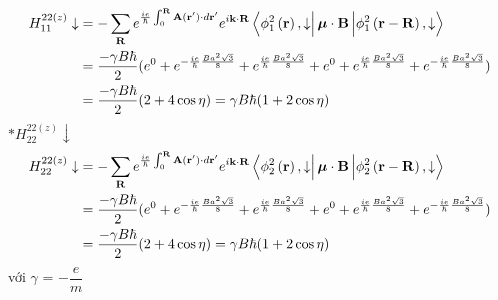 \documentclass{report}
\newcommand{\f}[2]{\dfrac{#1}{#2}}
\begin{document}
\begin{align*}
	H_{11}^{22(z)} \downarrow & = - \sum_{\mathbf{R}} e^{\frac{ie}{\hbar}\int_0^{\mathbf{R}}\mathbf{A}(\mathbf{r'})\cdot d\mathbf{r'}}e^{i\mathbf{k\cdot R}} \bra{\phi^{2}_{1} \left(\mathbf{r}\right), \downarrow} \boldsymbol{\mu}\cdot \mathbf{B} \ket{\phi^{2}_{1} \left(\mathbf{r - R}\right) ,\downarrow} \\
	                          & = \f{ -\gamma B\hbar}{2} (e^{0} + e^{-\frac{ie}{\hbar}\frac{Ba^2\sqrt{3}}{8}} + e^{\frac{ie}{\hbar}\frac{Ba^2\sqrt{3}}{8}} + e^{0} +
	e^{\frac{ie}{\hbar}\frac{Ba^2\sqrt{3}}{8}}
	+ e^{-\frac{ie}{\hbar}\frac{Ba^2\sqrt{3}}{8}} )                                                                                                                                                                                                                                                             \\
	                          & = \f{-\gamma B\hbar}{2} (2 + 4\cos\eta)  = \gamma B\hbar(1+2\cos\eta)
\end{align*}
$\ast 	H_{22}^{22(z)} \downarrow$
\begin{align*}
	H_{22}^{22(z)} \downarrow & = - \sum_{\mathbf{R}} e^{\frac{ie}{\hbar}\int_0^{\mathbf{R}}\mathbf{A}(\mathbf{r'})\cdot d\mathbf{r'}}e^{i\mathbf{k\cdot R}} \bra{\phi^{2}_{2} \left(\mathbf{r}\right), \downarrow} \boldsymbol{\mu}\cdot \mathbf{B} \ket{\phi^{2}_{2} \left(\mathbf{r - R}\right) ,\downarrow} \\
	                          & = \f{ -\gamma B\hbar}{2} (e^{0} + e^{-\frac{ie}{\hbar}\frac{Ba^2\sqrt{3}}{8}} + e^{\frac{ie}{\hbar}\frac{Ba^2\sqrt{3}}{8}} + e^{0} +
	e^{\frac{ie}{\hbar}\frac{Ba^2\sqrt{3}}{8}}
	+ e^{-\frac{ie}{\hbar}\frac{Ba^2\sqrt{3}}{8}} )                                                                                                                                                                                                                                                             \\
	                          & = \f{-\gamma B\hbar}{2} (2 + 4\cos\eta)  = \gamma B\hbar(1+2\cos\eta)
\end{align*}
với $\gamma$ = $-\dfrac{e}{m}$
\end{document}
